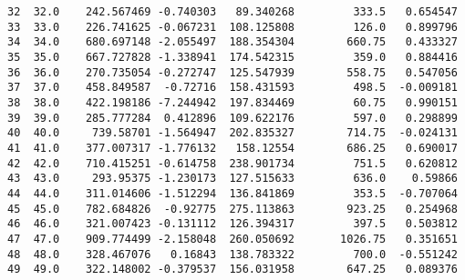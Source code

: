 \documentclass[11pt]{article}
\begin{document}
\begin{tcolorbox}[breakable, size=fbox, boxrule=.5pt, pad at break*=1mm, opacityfill=0]
\begin{Verbatim}[commandchars=\\\{\}]
32  32.0    242.567469 -0.740303   89.340268         333.5   0.654547
33  33.0    226.741625 -0.067231  108.125808         126.0   0.899796
34  34.0    680.697148 -2.055497  188.354304        660.75   0.433327
35  35.0    667.727828 -1.338941  174.542315         359.0   0.884416
36  36.0    270.735054 -0.272747  125.547939        558.75   0.547056
37  37.0    458.849587  -0.72716  158.431593         498.5  -0.009181
38  38.0    422.198186 -7.244942  197.834469         60.75   0.990151
39  39.0    285.777284  0.412896  109.622176         597.0   0.298899
40  40.0     739.58701 -1.564947  202.835327        714.75  -0.024131
41  41.0    377.007317 -1.776132   158.12554        686.25   0.690017
42  42.0    710.415251 -0.614758  238.901734         751.5   0.620812
43  43.0     293.95375 -1.230173  127.515633         636.0    0.59866
44  44.0    311.014606 -1.512294  136.841869         353.5  -0.707064
45  45.0    782.684826  -0.92775  275.113863        923.25   0.254968
46  46.0    321.007423 -0.131112  126.394317         397.5   0.503812
47  47.0    909.774499 -2.158048  260.050692       1026.75   0.351651
48  48.0    328.467076   0.16843  138.783322         700.0  -0.551242
49  49.0    322.148002 -0.379537  156.031958        647.25   0.089376


\end{Verbatim}
\end{tcolorbox}
\end{document}
